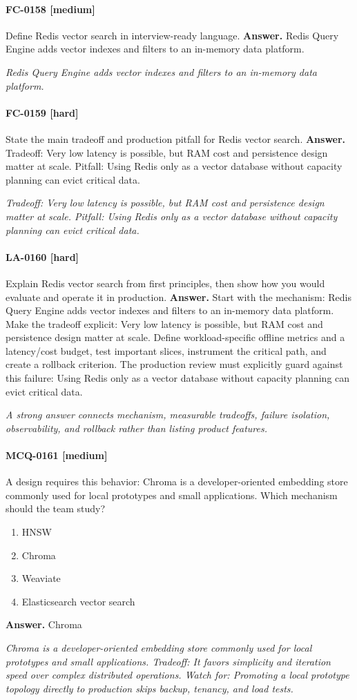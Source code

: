 \paragraph{FC-0158 [medium]} Define Redis vector search in interview-ready language.
\noindent\textbf{Answer.} Redis Query Engine adds vector indexes and filters to an in-memory data platform.
\par\textit{Redis Query Engine adds vector indexes and filters to an in-memory data platform.}
\paragraph{FC-0159 [hard]} State the main tradeoff and production pitfall for Redis vector search.
\noindent\textbf{Answer.} Tradeoff: Very low latency is possible, but RAM cost and persistence design matter at scale. Pitfall: Using Redis only as a vector database without capacity planning can evict critical data.
\par\textit{Tradeoff: Very low latency is possible, but RAM cost and persistence design matter at scale. Pitfall: Using Redis only as a vector database without capacity planning can evict critical data.}
\paragraph{LA-0160 [hard]} Explain Redis vector search from first principles, then show how you would evaluate and operate it in production.
\noindent\textbf{Answer.} Start with the mechanism: Redis Query Engine adds vector indexes and filters to an in-memory data platform. Make the tradeoff explicit: Very low latency is possible, but RAM cost and persistence design matter at scale. Define workload-specific offline metrics and a latency/cost budget, test important slices, instrument the critical path, and create a rollback criterion. The production review must explicitly guard against this failure: Using Redis only as a vector database without capacity planning can evict critical data.
\par\textit{A strong answer connects mechanism, measurable tradeoffs, failure isolation, observability, and rollback rather than listing product features.}
\paragraph{MCQ-0161 [medium]} A design requires this behavior: Chroma is a developer-oriented embedding store commonly used for local prototypes and small applications. Which mechanism should the team study?
\begin{enumerate}[label=\Alph*.]
\item HNSW
\item Chroma
\item Weaviate
\item Elasticsearch vector search
\end{enumerate}
\noindent\textbf{Answer.} Chroma
\par\textit{Chroma is a developer-oriented embedding store commonly used for local prototypes and small applications. Tradeoff: It favors simplicity and iteration speed over complex distributed operations. Watch for: Promoting a local prototype topology directly to production skips backup, tenancy, and load tests.}
